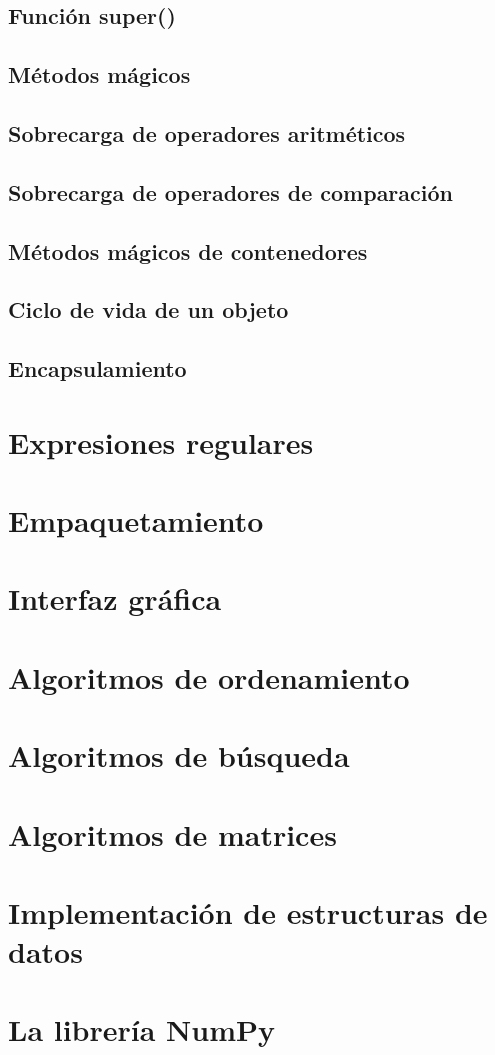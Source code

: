 \documentclass{article}
\begin{document}
\subsection{Función super()}

\subsection{Métodos mágicos}

\subsection{Sobrecarga de operadores aritméticos}

\subsection{Sobrecarga de operadores de comparación}

\subsection{Métodos mágicos de contenedores}

\subsection{Ciclo de vida de un objeto}

\subsection{Encapsulamiento}

\section{Expresiones regulares}

\section{Empaquetamiento}

\section{Interfaz gráfica}

\section{Algoritmos de ordenamiento}

\section{Algoritmos de búsqueda}

\section{Algoritmos de matrices}

\section{Implementación de estructuras de datos}

\section{La librería NumPy}
\end{document}
